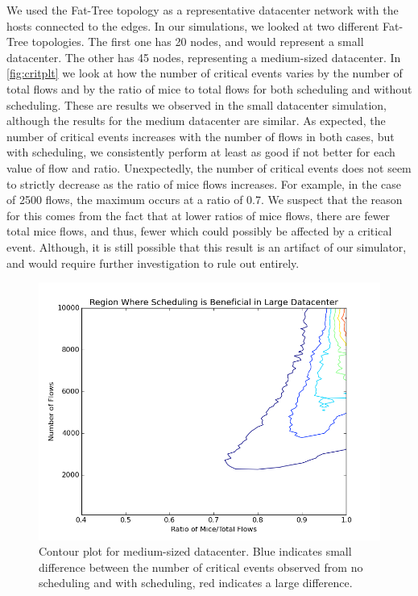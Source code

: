We used the Fat-Tree topology \cite{fattree} as a representative datacenter
network with the hosts connected to the edges. In our simulations, we looked at
two different Fat-Tree topologies. The first one has 20 nodes, and
would represent a small datacenter. The other has 45 nodes, representing a
medium-sized datacenter. In \ref{fig:critplt} we look at how the
number of critical events varies by the number of total flows and by the ratio
of mice to total flows for both scheduling and without scheduling. These are
results we observed in the small datacenter simulation, although the results
for the medium datacenter are similar. As expected, the number of critical events
increases with the number of flows in both cases, but with scheduling, we 
consistently perform at least as good if not better for each value of flow and
ratio. Unexpectedly, the number of critical events does not seem to strictly
decrease as the ratio of mice flows increases. For example, in the case of 2500
flows, the maximum occurs at a ratio of 0.7. We suspect that the reason for this
comes from the fact that at lower ratios of mice flows, there are fewer total
mice flows, and thus, fewer which could possibly be affected by a critical
event. Although, it is still possible that this result is an artifact of our
simulator, and would require further investigation to rule out entirely.
\begin{figure}[H]
	\centering
	\includegraphics[width=\columnwidth]{large_datacenter.png}
	\caption{Contour plot for medium-sized datacenter. Blue indicates small
    difference between the number of critical events observed from no
    scheduling and with scheduling, red indicates a large difference.}
	\label{fig:largedc}
\end{figure}

